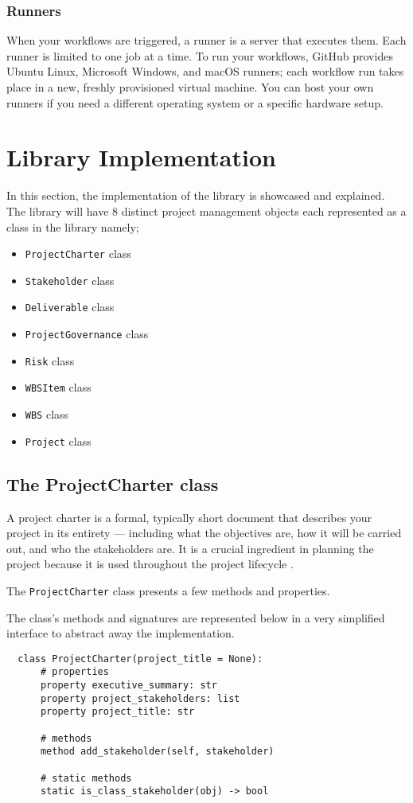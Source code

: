 \subsubsection{Runners}
When your workflows are triggered, a runner is a server that executes them. Each runner is limited to one job at a time. To run your workflows, GitHub provides Ubuntu Linux, Microsoft Windows, and macOS runners; each workflow run takes place in a new, freshly provisioned virtual machine. You can host your own runners if you need a different operating system or a specific hardware setup.

\section{Library Implementation}
In this section, the implementation of the library is showcased and explained. The library will have 8 distinct project management objects each represented as a class in the library namely;

\begin{itemize}
  \item \verb +ProjectCharter+ class
  \item \verb +Stakeholder+ class
  \item \verb +Deliverable+ class
  \item \verb +ProjectGovernance+ class
  \item \verb +Risk+ class
  \item \verb +WBSItem+ class
  \item \verb +WBS+ class
  \item \verb +Project+ class
\end{itemize}

\subsection{The ProjectCharter class}
A project charter is a formal, typically short document that describes your project in its entirety — including what the objectives are, how it will be carried out, and who the stakeholders are. It is a crucial ingredient in planning the project because it is used throughout the project lifecycle \cite{wrike}.

The \verb+ProjectCharter+ class presents a few methods and properties.

The class's methods and signatures are represented below in a very simplified interface to abstract away the implementation.\\
\begin{lstlisting}
  class ProjectCharter(project_title = None):
      # properties
      property executive_summary: str
      property project_stakeholders: list
      property project_title: str

      # methods
      method add_stakeholder(self, stakeholder)

      # static methods
      static is_class_stakeholder(obj) -> bool
\end{lstlisting}

